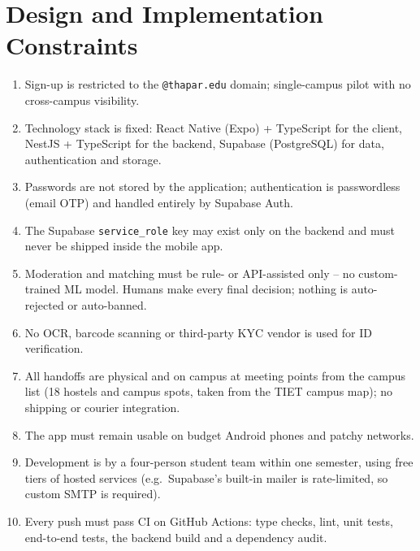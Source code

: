 \documentclass[11pt,a4paper]{scrreprt}
\begin{document}
\section{Design and Implementation Constraints}
\begin{enumerate}[label=\textbf{C\arabic*.}]
  \item Sign-up is restricted to the \texttt{@thapar.edu} domain; single-campus
    pilot with no cross-campus visibility.
  \item Technology stack is fixed: React Native (Expo) + TypeScript for the
    client, NestJS + TypeScript for the backend, Supabase (PostgreSQL) for
    data, authentication and storage.
  \item Passwords are not stored by the application; authentication is
    passwordless (email OTP) and handled entirely by Supabase Auth.
  \item The Supabase \texttt{service_role} key may exist only on the
    backend and must never be shipped inside the mobile app.
  \item Moderation and matching must be rule- or API-assisted only -- no
    custom-trained ML model. Humans make every final decision; nothing is
    auto-rejected or auto-banned.
  \item No OCR, barcode scanning or third-party KYC vendor is used for ID
    verification.
  \item All handoffs are physical and on campus at meeting points from the
    campus list (18 hostels and campus spots, taken from the TIET campus
    map); no shipping or courier integration.
  \item The app must remain usable on budget Android phones and patchy
    networks.
  \item Development is by a four-person student team within one semester,
    using free tiers of hosted services (e.g.\ Supabase's built-in mailer is
    rate-limited, so custom SMTP is required).
  \item Every push must pass CI on GitHub Actions: type checks, lint, unit
    tests, end-to-end tests, the backend build and a dependency audit.
\end{enumerate}
\end{document}
